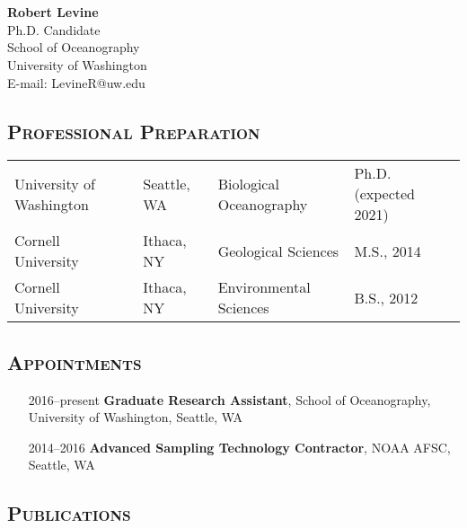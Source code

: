 \documentclass[svgnames,12pt,a4paper]{article}
\date{}
\author{}
\let\origsection\section%
\let\section\subsubsection%
\let\section\origsection%
\begin{document}
\section*{}
\textbf{\large{Robert Levine}}\\
Ph.D. Candidate\\
School of Oceanography\\
University of Washington\\
E-mail: LevineR@uw.edu\\
\vspace*{-.7cm}

\subsection*{\textsc{Professional Preparation}}
\begin{tabular}{ l l l l }
 University of Washington & Seattle, WA & Biological Oceanography & Ph.D. (expected 2021) \\
 Cornell University & Ithaca, NY & Geological Sciences & M.S., 2014 \\
 Cornell University & Ithaca, NY & Environmental Sciences & B.S., 2012 \\
\end{tabular}
\vspace*{-.5cm}

\subsection*{\textsc{Appointments}}
\vspace*{-.2cm}
\begin{itemize}[label={--9999:},leftmargin=*,itemsep=-3pt]
\item[2016--present]
    \textbf{Graduate Research Assistant},
    School of Oceanography, University of Washington, Seattle, WA
\item[2014--2016]
    \textbf{Advanced Sampling Technology Contractor},
    NOAA AFSC, Seattle, WA
\end{itemize}

\vspace*{-.7cm}
\subsection*{\textsc{Publications}}
\end{document}
